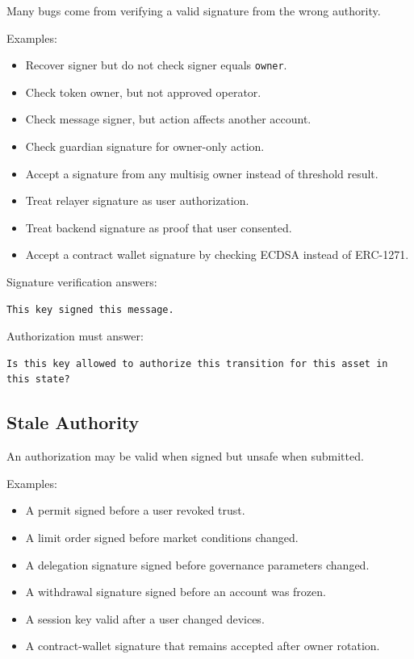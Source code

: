 Many bugs come from verifying a valid signature from the wrong
authority.

Examples:

\begin{itemize}
\tightlist
\item
  Recover signer but do not check signer equals
  \passthrough{\lstinline!owner!}.
\item
  Check token owner, but not approved operator.
\item
  Check message signer, but action affects another account.
\item
  Check guardian signature for owner-only action.
\item
  Accept a signature from any multisig owner instead of threshold
  result.
\item
  Treat relayer signature as user authorization.
\item
  Treat backend signature as proof that user consented.
\item
  Accept a contract wallet signature by checking ECDSA instead of
  ERC-1271.
\end{itemize}

Signature verification answers:

\begin{lstlisting}
This key signed this message.
\end{lstlisting}

Authorization must answer:

\begin{lstlisting}
Is this key allowed to authorize this transition for this asset in this state?
\end{lstlisting}

\subsection{Stale Authority}

An authorization may be valid when signed but unsafe when submitted.

Examples:

\begin{itemize}
\tightlist
\item
  A permit signed before a user revoked trust.
\item
  A limit order signed before market conditions changed.
\item
  A delegation signature signed before governance parameters changed.
\item
  A withdrawal signature signed before an account was frozen.
\item
  A session key valid after a user changed devices.
\item
  A contract-wallet signature that remains accepted after owner
  rotation.
\end{itemize}

